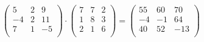 \documentclass{article}
\begin{document}
\begin{center}

$
\begin{pmatrix}
5 & 2 & 9 \\
-4 & 2 & 11 \\
7 & 1 & -5 \\
\end{pmatrix}  \cdot 
\begin{pmatrix}
7 & 7 & 2 \\
1 & 8 & 3 \\
2 & 1 & 6 \\
\end{pmatrix}
=
\begin{pmatrix}
55 & 60 & 70 \\
-4 & -1 & 64 \\
40 & 52 & -13 \\
\end{pmatrix}
$
\end{center}
\end{document}
